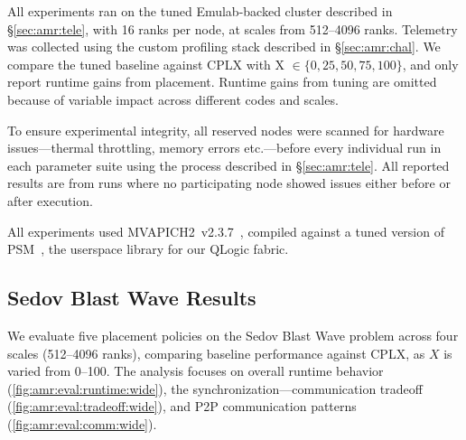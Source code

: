 
All experiments ran on the tuned Emulab-backed cluster described in \S\ref{sec:amr:tele}, with 16 ranks
per node, at scales from 512--4096 ranks.
Telemetry was collected using the custom profiling stack described in \S\ref{sec:amr:chal}.
We compare the tuned baseline against CPLX with X $\in \{0, 25, 50, 75, 100\}$, and only report
runtime gains from placement.
Runtime gains from tuning are omitted because of variable impact across different codes and scales.

To ensure experimental integrity, all reserved nodes were scanned for hardware issues---thermal
throttling, memory errors etc.---before every individual run in each parameter suite using the
process described in \S\ref{sec:amr:tele}.
All reported results are from runs where no participating node showed issues either before or after
execution.

All experiments used MVAPICH2~v2.3.7~\cite{Panda2021:MVAPICH}, compiled against a tuned version of
PSM~\cite{2020:IntelPerformanceScaled}, the userspace library for our QLogic fabric.

\figAmrEvalRuntime

\subsection{Sedov Blast Wave Results}\label{sec:amr:eval:sedov}

We evaluate five placement policies on the Sedov Blast Wave problem across four scales (512--4096
ranks), comparing baseline performance against CPLX, as $X$ is varied from 0--100.
The analysis focuses on overall runtime behavior (\cref{fig:amr:eval:runtime:wide}), the
synchronization---communication tradeoff (\cref{fig:amr:eval:tradeoff:wide}), and P2P communication
patterns (\cref{fig:amr:eval:comm:wide}).

